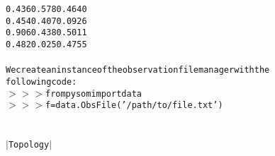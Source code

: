 {{\begin{tabbing}
{\texttt{0.436\hspace{6pt}0.578\hspace{6pt}0.464\hspace{6pt}0}}\\
{\texttt{0.454\hspace{6pt}0.407\hspace{6pt}0.092\hspace{6pt}6}}\\
{\texttt{0.906\hspace{6pt}0.438\hspace{6pt}0.501\hspace{6pt}1}}\\
{\texttt{0.482\hspace{6pt}0.025\hspace{6pt}0.475\hspace{6pt}5}}\\
\\
{\texttt{We\hspace{6pt}create\hspace{6pt}an\hspace{6pt}instance\hspace{6pt}of\hspace{6pt}the\hspace{6pt}observation\hspace{6pt}file\hspace{6pt}manager\hspace{6pt}with\hspace{6pt}the}}\\
{\texttt{following\hspace{6pt}code:}}\\
{\texttt{$>$$>$$>$\hspace{6pt}from\hspace{6pt}pysom\hspace{6pt}import\hspace{6pt}data}}\\
{\texttt{$>$$>$$>$\hspace{6pt}f\hspace{6pt}=\hspace{6pt}data.ObsFile({'}/path/to/file.txt{'})}}\\
\\
{\texttt{\dash{}\dash{}\dash{}\dash{}\dash{}\dash{}\dash{}\dash{}\dash{}\dash{}\dash{}\dash{}}}\\
{\texttt{$|$\hspace{6pt}Topology\hspace{6pt}$|$}}\\
{\texttt{\dash{}\dash{}\dash{}\dash{}\dash{}\dash{}\dash{}\dash{}\dash{}\dash{}\dash{}\dash{}}}\\

\end{tabbing}}}
